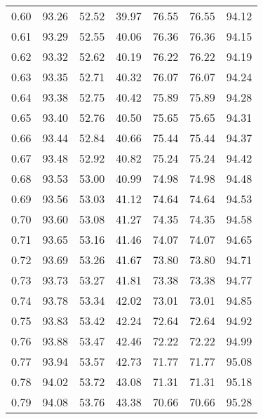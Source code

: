 \begin{tabular}{|c|c|c|c|c|c|c|}
      0.60 &     93.26 &     52.52 &      39.97 &   76.55 &      76.55 &         94.12 \\
      0.61 &     93.29 &     52.55 &      40.06 &   76.36 &      76.36 &         94.15 \\
      0.62 &     93.32 &     52.62 &      40.19 &   76.22 &      76.22 &         94.19 \\
      0.63 &     93.35 &     52.71 &      40.32 &   76.07 &      76.07 &         94.24 \\
      0.64 &     93.38 &     52.75 &      40.42 &   75.89 &      75.89 &         94.28 \\
      0.65 &     93.40 &     52.76 &      40.50 &   75.65 &      75.65 &         94.31 \\
      0.66 &     93.44 &     52.84 &      40.66 &   75.44 &      75.44 &         94.37 \\
      0.67 &     93.48 &     52.92 &      40.82 &   75.24 &      75.24 &         94.42 \\
      0.68 &     93.53 &     53.00 &      40.99 &   74.98 &      74.98 &         94.48 \\
      0.69 &     93.56 &     53.03 &      41.12 &   74.64 &      74.64 &         94.53 \\
      0.70 &     93.60 &     53.08 &      41.27 &   74.35 &      74.35 &         94.58 \\
      0.71 &     93.65 &     53.16 &      41.46 &   74.07 &      74.07 &         94.65 \\
      0.72 &     93.69 &     53.26 &      41.67 &   73.80 &      73.80 &         94.71 \\
      0.73 &     93.73 &     53.27 &      41.81 &   73.38 &      73.38 &         94.77 \\
      0.74 &     93.78 &     53.34 &      42.02 &   73.01 &      73.01 &         94.85 \\
      0.75 &     93.83 &     53.42 &      42.24 &   72.64 &      72.64 &         94.92 \\
      0.76 &     93.88 &     53.47 &      42.46 &   72.22 &      72.22 &         94.99 \\
      0.77 &     93.94 &     53.57 &      42.73 &   71.77 &      71.77 &         95.08 \\
      0.78 &     94.02 &     53.72 &      43.08 &   71.31 &      71.31 &         95.18 \\
      0.79 &     94.08 &     53.76 &      43.38 &   70.66 &      70.66 &         95.28 \\

\end{tabular}
